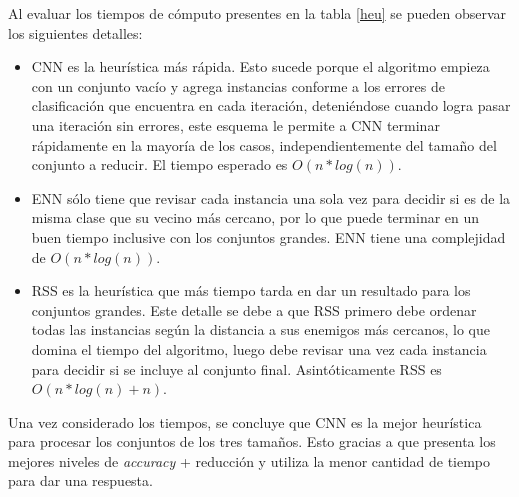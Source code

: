 Al evaluar los tiempos de cómputo presentes en la tabla \ref{heu} se pueden observar los siguientes detalles:

\begin{itemize}


\item CNN es la heurística más rápida. Esto sucede porque el algoritmo empieza con un conjunto vacío y agrega instancias conforme a los errores de clasificación que encuentra en cada iteración, deteniéndose cuando logra pasar una iteración sin errores, este esquema le permite a CNN terminar rápidamente en la mayoría de los casos, independientemente del tamaño del conjunto a reducir. El tiempo esperado es $O(n*log(n))$.



\item ENN sólo tiene que revisar cada instancia una sola vez para decidir si es de la misma clase que su vecino más cercano, por lo que puede terminar en un buen tiempo inclusive con los conjuntos grandes. ENN tiene una complejidad de $O(n*log(n))$.  

\item RSS es la heurística que más tiempo tarda en dar un resultado para los conjuntos grandes. Este detalle se debe a que RSS primero debe ordenar todas las instancias según la distancia a sus enemigos más cercanos, lo que domina el tiempo del algoritmo, luego debe revisar una vez cada instancia para decidir si se incluye al conjunto final. Asintóticamente RSS es $O(n*log(n) + n)$. 

\end{itemize}

Una vez considerado los tiempos, se concluye que CNN es la mejor heurística para procesar los conjuntos de los tres tamaños. Esto gracias a que presenta los mejores niveles de \emph{accuracy} + reducción y utiliza la menor cantidad de tiempo para dar una respuesta. 


